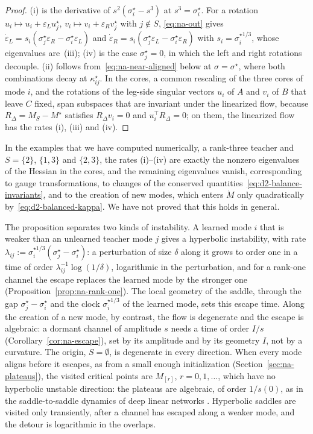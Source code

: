\documentclass[11pt]{article}
\theoremstyle{definition}
\numberwithin{equation}{section}
\begin{document}
\begin{proof}
(i) is the derivative of $s^2(\sigma^\star_i-s^3)$ at $s^3=\sigma^\star_i$. For a rotation $u_i\mapsto u_i+\varepsilon_Lu^\star_j$, $v_i\mapsto v_i+\varepsilon_Rv^\star_j$ with $j\notin S$, \eqref{eq:na-out} gives $\dot\varepsilon_L=s_i(\sigma^\star_j\varepsilon_R-\sigma^\star_i\varepsilon_L)$ and $\dot\varepsilon_R=s_i(\sigma^\star_j\varepsilon_L-\sigma^\star_i\varepsilon_R)$ with $s_i=\sigma^{\star1/3}_i$, whose eigenvalues are~(iii); (iv) is the case $\sigma^\star_j=0$, in which the left and right rotations decouple. (ii) follows from~\eqref{eq:na-near-aligned} below at $\sigma=\sigma^\star$, where both combinations decay at $\kappa^\star_{ij}$. In the cores, a common rescaling of the three cores of mode $i$, and the rotations of the leg-side singular vectors $u_i$ of $A$ and $v_i$ of $B$ that leave $C$ fixed, span subspaces that are invariant under the linearized flow, because $R_\Delta=M_S-M^\star$ satisfies $R_\Delta v_i=0$ and $u_i^\top R_\Delta=0$; on them, the linearized flow has the rates (i), (iii) and (iv).
\end{proof}

In the examples that we have computed numerically, a rank-three teacher and $S=\{2\}$, $\{1,3\}$ and $\{2,3\}$, the rates (i)--(iv) are exactly the nonzero eigenvalues of the Hessian in the cores, and the remaining eigenvalues vanish, corresponding to gauge transformations, to changes of the conserved quantities~\eqref{eq:d2-balance-invariants}, and to the creation of new modes, which enters $\dot M$ only quadratically by~\eqref{eq:d2-balanced-kappa}. We have not proved that this holds in general.

The proposition separates two kinds of instability. A learned mode $i$ that is weaker than an unlearned teacher mode $j$ gives a hyperbolic instability, with rate $\lambda_{ij}:=\sigma^{\star1/3}_i(\sigma^\star_j-\sigma^\star_i)$: a perturbation of size $\delta$ along it grows to order one in a time of order $\lambda_{ij}^{-1}\log(1/\delta)$, logarithmic in the perturbation, and for a rank-one channel the escape replaces the learned mode by the stronger one (Proposition~\ref{prop:na-rank-one}). The local geometry of the saddle, through the gap $\sigma^\star_j-\sigma^\star_i$ and the clock $\sigma^{\star1/3}_i$ of the learned mode, sets this escape time. Along the creation of a new mode, by contrast, the flow is degenerate and the escape is algebraic: a dormant channel of amplitude $s$ needs a time of order $I/s$ (Corollary~\ref{cor:na-escape}), set by its amplitude and by its geometry $I$, not by a curvature. The origin, $S=\emptyset$, is degenerate in every direction. When every mode aligns before it escapes, as from a small enough initialization (Section~\ref{sec:na-plateaus}), the visited critical points are $M_{[r]}$, $r=0,1,\dots$, which have no hyperbolic unstable direction: the plateaus are algebraic, of order $1/s(0)$, as in the saddle-to-saddle dynamics of deep linear networks \citep{saxe2014exact,jacot2021saddle}. Hyperbolic saddles are visited only transiently, after a channel has escaped along a weaker mode, and the detour is logarithmic in the overlaps.
\end{document}
